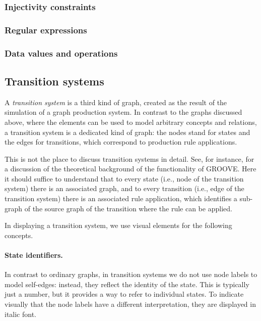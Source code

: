 \subsubsection{Injectivity constraints}

\subsubsection{Regular expressions}

\subsubsection{Data values and operations}

\subsection{Transition systems}

A \emph{transition system} is a third kind of graph, created as the result of
the simulation of a graph production system. In contrast to the graphs
discussed above, where the elements can be used to model arbitrary concepts and
relations, a transition system is a dedicated kind of graph: the nodes stand
for states and the edges for transitions, which correspond to production rule
applications.

This is not the place to discuss transition systems in detail. See, for
instance, \cite{Rensink2003a} for a discussion of the theoretical background of the
functionality of GROOVE. Here it should suffice to understand that to every
state (i.e., node of the transition system) there is an associated graph, and
to every transition (i.e., edge of the transition system) there is an
associated rule application, which identifies a sub-graph of the source graph
of the transition where the rule can be applied.

In displaying a transition system, we use visual elements for the
following concepts.

\paragraph{State identifiers.}

In contrast to ordinary graphs, in transition systems we do not use node labels
to model self-edges: instead, they reflect the identity of the state. This is
typically just a number, but it provides a way to refer to individual
states. To indicate visually that the node labels have a different
interpretation, they are displayed in italic font.

